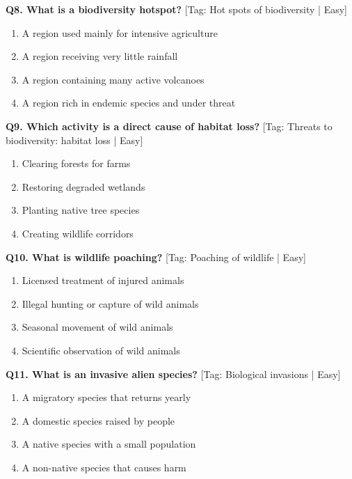\noindent\textbf{Q8. What is a biodiversity hotspot?} \hfill [Tag: Hot spots of biodiversity | Easy]
\begin{enumerate}[label=(\alph*),topsep=2pt,itemsep=1pt,partopsep=0pt,parsep=0pt]
    \item {A region used mainly for intensive agriculture}
    \item {A region receiving very little rainfall}
    \item {A region containing many active volcanoes}
    \item {A region rich in endemic species and under threat}
\end{enumerate}
\vspace{2mm}

\noindent\textbf{Q9. Which activity is a direct cause of habitat loss?} \hfill [Tag: Threats to biodiversity: habitat loss | Easy]
\begin{enumerate}[label=(\alph*),topsep=2pt,itemsep=1pt,partopsep=0pt,parsep=0pt]
    \item {Clearing forests for farms}
    \item {Restoring degraded wetlands}
    \item {Planting native tree species}
    \item {Creating wildlife corridors}
\end{enumerate}
\vspace{2mm}

\noindent\textbf{Q10. What is wildlife poaching?} \hfill [Tag: Poaching of wildlife | Easy]
\begin{enumerate}[label=(\alph*),topsep=2pt,itemsep=1pt,partopsep=0pt,parsep=0pt]
    \item {Licensed treatment of injured animals}
    \item {Illegal hunting or capture of wild animals}
    \item {Seasonal movement of wild animals}
    \item {Scientific observation of wild animals}
\end{enumerate}
\vspace{2mm}

\noindent\textbf{Q11. What is an invasive alien species?} \hfill [Tag: Biological invasions | Easy]
\begin{enumerate}[label=(\alph*),topsep=2pt,itemsep=1pt,partopsep=0pt,parsep=0pt]
    \item {A migratory species that returns yearly}
    \item {A domestic species raised by people}
    \item {A native species with a small population}
    \item {A non-native species that causes harm}
\end{enumerate}
\vspace{2mm}

